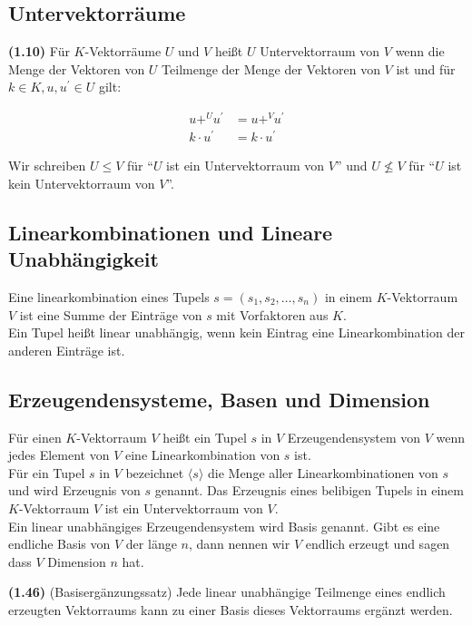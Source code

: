 \documentclass[11pt]{scrartcl}
\newlength{\hangwidth}
\newcommand{\skript}[1]{\settowidth{\hangwidth}{\textbf{(#1)} }\hangpara{\hangwidth}{1}\textbf{(#1)} }%
\begin{document}
\subsection{Untervektorräume}

\skript{1.10} Für $K$-Vektorräume $U$ und $V$ heißt $U$ Untervektorraum von $V$ wenn die Menge der Vektoren von $U$ Teilmenge der Menge der Vektoren von $V$ ist und für $k \in K, u,u^\prime \in U$ gilt:

\begin{align*}
	u {+}^{U} u^\prime &= u {+}^{V} u^\prime	\\
	k \cdot u^\prime &= k \cdot u^\prime
\end{align*}

Wir schreiben $U \leq V$ für ``$U$ ist ein Untervektorraum von $V$'' und $U \nleq V$ für ``$U$ ist kein Untervektorraum von $V$''.

\subsection{Linearkombinationen und Lineare Unabhängigkeit}

Eine linearkombination eines Tupels $s = (s_1,s_2, \ldots, s_n)$ in einem $K$-Vektorraum $V$ ist eine Summe der Einträge von $s$ mit Vorfaktoren aus $K$.	\\
Ein Tupel heißt linear unabhängig, wenn kein Eintrag eine Linearkombination der anderen Einträge ist.

\subsection{Erzeugendensysteme, Basen und Dimension}

Für einen $K$-Vektorraum $V$ heißt ein Tupel $s$ in $V$ Erzeugendensystem von $V$ wenn jedes Element von $V$ eine Linearkombination von $s$ ist.	\\
Für ein Tupel $s$ in $V$ bezeichnet $\langle s \rangle$ die Menge aller Linearkombinationen von $s$ und wird Erzeugnis von $s$ genannt. Das Erzeugnis eines belibigen Tupels in einem $K$-Vektorraum $V$ ist ein Untervektorraum von $V$.	\\
Ein linear unabhängiges Erzeugendensystem wird Basis genannt. Gibt es eine endliche Basis von $V$ der länge $n$, dann nennen wir $V$ endlich erzeugt und sagen dass $V$ Dimension $n$ hat.

\skript{1.46} (Basisergänzungssatz) Jede linear unabhängige Teilmenge eines endlich erzeugten Vektorraums kann zu einer Basis dieses Vektorraums ergänzt werden.
\end{document}
